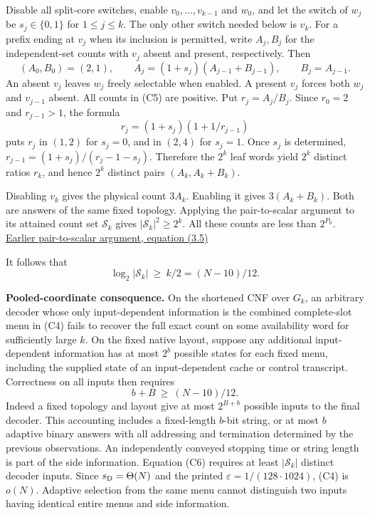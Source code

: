 \documentclass[
  11pt,
]{article}
\begin{document}
Disable all split-core switches, enable \(v_0,\ldots,v_{k-1}\) and
\(w_0\), and let the switch of \(w_j\) be \(s_j\in\{0,1\}\) for
\(1\le j\le k\). The only other switch needed below is \(v_k\). For a
prefix ending at \(v_j\) when its inclusion is permitted, write
\(A_j,B_j\) for the independent-set counts with \(v_j\) absent and
present, respectively. Then \[
       (A_0,B_0)=(2,1),\qquad
       A_j=(1+s_j)(A_{j-1}+B_{j-1}),\qquad B_j=A_{j-1}.           \tag{C5}
\] An absent \(v_j\) leaves \(w_j\) freely selectable when enabled. A
present \(v_j\) forces both \(w_j\) and \(v_{j-1}\) absent. All counts
in (C5) are positive. Put \(r_j=A_j/B_j\). Since \(r_0=2\) and
\(r_{j-1}>1\), the formula \[
                r_j=(1+s_j)(1+1/r_{j-1})
\] puts \(r_j\) in \((1,2)\) for \(s_j=0\), and in \((2,4)\) for
\(s_j=1\). Once \(s_j\) is determined, \(r_{j-1}=(1+s_j)/(r_j-1-s_j)\).
Therefore the \(2^k\) leaf words yield \(2^k\) distinct ratios \(r_k\),
and hence \(2^k\) distinct pairs \((A_k,A_k+B_k)\).

Disabling \(v_k\) gives the physical count \(3A_k\). Enabling it gives
\(3(A_k+B_k)\). Both are answers of the same fixed topology. Applying
the pair-to-scalar argument to its attained count set \(\mathcal S_k\)
gives \(|\mathcal S_k|^2\ge 2^k\). All these counts are less than
\(2^{P_0}\). \href{https://arxiv.org/html/2604.19094\#S3.E5}{Earlier
pair-to-scalar argument, equation (3.5)}

It follows that \[
              \log_2|\mathcal S_k|\ \ge\ k/2=(N-10)/12.            \tag{C6}
\]

\textbf{Pooled-coordinate consequence.} On the shortened CNF over
\(G_k\), an arbitrary decoder whose only input-dependent information is
the combined complete-slot menu in (C4) fails to recover the full exact
count on some availability word for sufficiently large \(k\). On the
fixed native layout, suppose any additional input-dependent information
has at most \(2^b\) possible states for each fixed menu, including the
supplied state of an input-dependent cache or control transcript.
Correctness on all inputs then requires \[
                         b+B\ \ge\ (N-10)/12 .
\] Indeed a fixed topology and layout give at most \(2^{B+b}\) possible
inputs to the final decoder. This accounting includes a fixed-length
\(b\)-bit string, or at most \(b\) adaptive binary answers with all
addressing and termination determined by the previous observations. An
independently conveyed stopping time or string length is part of the
side information. Equation (C6) requires at least \(|\mathcal S_k|\)
distinct decoder inputs. Since \(s_{\rm D}=\Theta(N)\) and the printed
\(\varepsilon=1/(128\cdot1024)\), (C4) is \(o(N)\). Adaptive selection
from the same menu cannot distinguish two inputs having identical entire
menus and side information.
\end{document}

